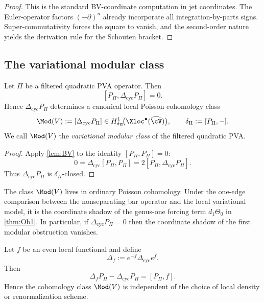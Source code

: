 \begin{proof}
This is the standard BV-coordinate computation in jet coordinates. The Euler-operator
factors $(-\partial)^n$ already incorporate all integration-by-parts signs. Super-commutativity
forces the square to vanish, and the second-order nature yields the derivation rule for the
Schouten bracket.
\end{proof}

\subsection{The variational modular class}

\begin{theorem}\label{thm:modclass}
Let $\Pi$ be a filtered quadratic PVA operator. Then
\[
[P_\Pi,\Delta_{\mathrm{cyc}}P_\Pi]=0.
\]
Hence $\Delta_{\mathrm{cyc}}P_\Pi$ determines a canonical local Poisson cohomology class
\[
\Mod(V):=[\Delta_{\mathrm{cyc}}P_\Pi]\in
H^1_{\delta_\Pi}\!\big(\Xloc^\bullet(\widehat{\cV})\big),
\qquad
\delta_\Pi:=[P_\Pi,-].
\]
We call $\Mod(V)$ the \emph{variational modular class} of the filtered quadratic PVA.
\end{theorem}

\begin{proof}
Apply \cref{lem:BV} to the identity $[P_\Pi,P_\Pi]=0$:
\[
0=\Delta_{\mathrm{cyc}}[P_\Pi,P_\Pi]=2[P_\Pi,\Delta_{\mathrm{cyc}}P_\Pi].
\]
Thus $\Delta_{\mathrm{cyc}}P_\Pi$ is $\delta_\Pi$-closed.
\end{proof}

\begin{remark}
The class $\Mod(V)$ lives in ordinary Poisson cohomology. Under the one-edge comparison
between the nonseparating bar operator and the local variational model, it is the coordinate
shadow of the genus-one forcing term $d_1\Theta_0$ in \cref{thm:Ob1}. In particular, if
$\Delta_{\mathrm{cyc}}P_\Pi=0$ then the coordinate shadow of the first modular obstruction
vanishes.
\end{remark}

\begin{lemma}\label{lem:gaugeind}
Let $f$ be an even local functional and define
\[
\Delta_f:=e^{-f}\Delta_{\mathrm{cyc}}e^f.
\]
Then
\[
\Delta_fP_\Pi-\Delta_{\mathrm{cyc}}P_\Pi=[P_\Pi,f].
\]
Hence the cohomology class $\Mod(V)$ is independent of the choice of local density
or renormalization scheme.
\end{lemma}

